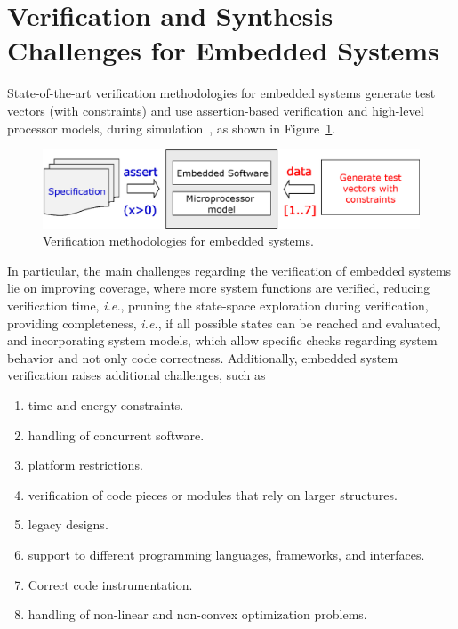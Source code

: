 \documentclass{acm_sen_article}
\begin{document}
\section{Verification and Synthesis \\ Challenges for Embedded Systems}
\label{Verification-Challenges} 

State-of-the-art verification methodologies for embedded systems generate test vectors (with constraints) and use assertion-based verification and high-level processor models, during simulation~\cite{Behrend15,Lettnin09}, as shown in Figure~\ref{verification-methodologies}. 
%
\begin{figure}[h]
	\centering
	\includegraphics[scale=0.35]{figure3.eps}
	\caption{Verification methodologies for embedded systems.}
	\label{verification-methodologies}
\end{figure}


In particular, the main challenges regarding the verification of embedded systems lie on improving coverage, where more system functions are verified, reducing verification time, {\it i.e.}, pruning the state-space exploration during verification, providing completeness, {\it i.e.},  if all possible states can be reached and evaluated, and incorporating system models, which allow specific checks regarding system behavior and not only code correctness. Additionally, embedded system verification raises additional challenges, such as 
%
\begin{enumerate}
	\item time and energy constraints.
	\item handling of concurrent software.
	\item platform restrictions.
	\item verification of code pieces or modules that rely on larger structures.
	\item legacy designs. %
	\item support to different programming languages, frameworks, and interfaces.
	\item Correct code instrumentation.
	\item handling of non-linear and non-convex optimization problems.
\end{enumerate}
\end{document}
